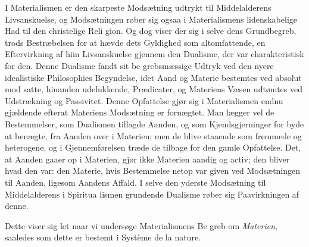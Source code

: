 \documentclass[12pt,a4paper]{book}
\begin{document}
I Materialismen er den skarpeste Modsætning udtrykt til
Middelalderens Livsanskuelse, og Modsætningen røber sig ogsaa
i Materialismens lidenskabelige Had til den christelige Reli\-%
gion. Og dog viser der sig i selve dens Grundbegreb, trods
Bestræbelsen for at hævde dets Gyldighed som altomfattende,
en Eftervirkning af hiin Livsanskuelse gjennem den Dualisme,
der var charakteristisk for den. Denne Dualisme fandt sit be\-%
grebsmæssige Udtryk ved den nyere idealistiske Philosophies
Begyndelse, idet Aand og Materie bestemtes ved absolut mod\-%
satte, hinanden udelukkende, Prædicater, og Materiens Væsen
udtømtes ved Udstrækning og Passivitet. Denne Opfattelse
gjør sig i Materialismen endnu gjældende efterat Materiens
Modsætning er fornægtet. Man lægger vel de Bestemmelser,
som Dualismen tillagde Aanden, og som Kjendsgjerninger for\-%
byde at benægte, fra Aanden over i Materien; men de blive
staaende som fremmede og heterogene, og i Gjennemførelsen
træde de tilbage for den gamle Opfattelse. Det, at Aanden
gaaer op i Materien, gjør ikke Materien aandig og activ; den
bliver hvad den var: den Materie, hvis Bestemmelse netop var
given ved Modsætningen til Aanden, ligesom Aandens Affald.
I selve den yderste Modsætning til Middelalderens i Spiritua\-%
lismen grundende Dualisme røber sig Paavirkningen af denne.

Dette viser sig let naar vi undersøge Materialismens Be\-%
greb om \emph{Materien}, saaledes som dette er bestemt i Système
de la nature.
\end{document}
